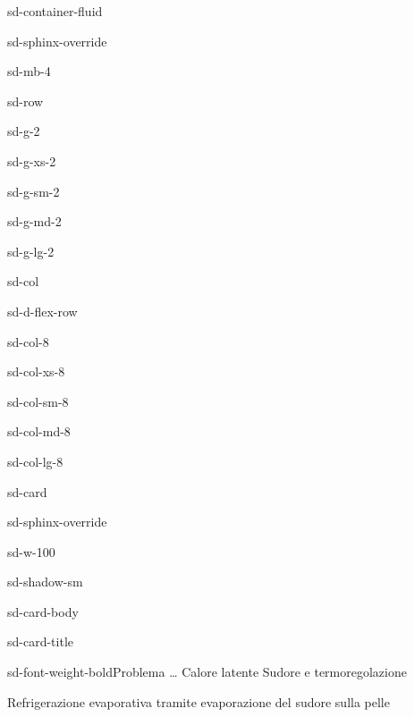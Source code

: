 \documentclass[letterpaper,10pt,italian]{jupyterBook}
\begin{document}
\begin{sphinxuseclass}{sd-container-fluid}
\begin{sphinxuseclass}{sd-sphinx-override}
\begin{sphinxuseclass}{sd-mb-4}
\begin{sphinxuseclass}{sd-row}
\begin{sphinxuseclass}{sd-g-2}
\begin{sphinxuseclass}{sd-g-xs-2}
\begin{sphinxuseclass}{sd-g-sm-2}
\begin{sphinxuseclass}{sd-g-md-2}
\begin{sphinxuseclass}{sd-g-lg-2}
\begin{sphinxuseclass}{sd-col}
\begin{sphinxuseclass}{sd-d-flex-row}
\begin{sphinxuseclass}{sd-col-8}
\begin{sphinxuseclass}{sd-col-xs-8}
\begin{sphinxuseclass}{sd-col-sm-8}
\begin{sphinxuseclass}{sd-col-md-8}
\begin{sphinxuseclass}{sd-col-lg-8}
\begin{sphinxuseclass}{sd-card}
\begin{sphinxuseclass}{sd-sphinx-override}
\begin{sphinxuseclass}{sd-w-100}
\begin{sphinxuseclass}{sd-shadow-sm}
\begin{sphinxuseclass}{sd-card-body}
\begin{sphinxuseclass}{sd-card-title}
\begin{sphinxuseclass}{sd-font-weight-bold}Problema … Calore latente \sphinxhyphen{} Sudore e termoregolazione
\end{sphinxuseclass}
\end{sphinxuseclass}
\sphinxAtStartPar
Refrigerazione evaporativa tramite evaporazione del sudore sulla pelle


\end{sphinxuseclass}
\end{sphinxuseclass}
\end{sphinxuseclass}
\end{sphinxuseclass}
\end{sphinxuseclass}
\end{sphinxuseclass}
\end{sphinxuseclass}
\end{sphinxuseclass}
\end{sphinxuseclass}
\end{sphinxuseclass}
\end{sphinxuseclass}
\end{sphinxuseclass}
\end{sphinxuseclass}
\end{sphinxuseclass}
\end{sphinxuseclass}
\end{sphinxuseclass}
\end{sphinxuseclass}
\end{sphinxuseclass}
\end{sphinxuseclass}
\end{sphinxuseclass}
\end{sphinxuseclass}
\end{document}
